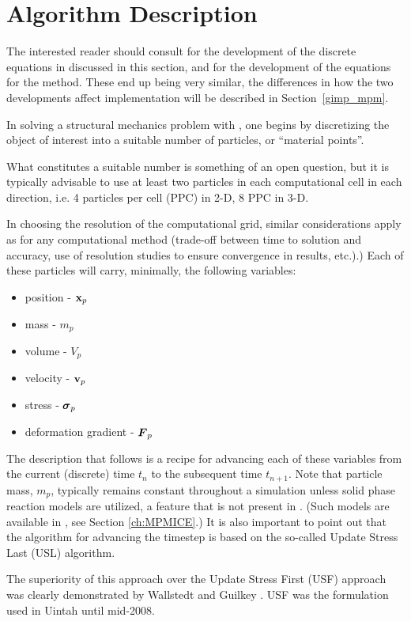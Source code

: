 \section{Algorithm Description} \label{Sec:AlgDesc}
The interested reader should consult \cite{Sulsky1994,Sulsky1995} for the development
of the discrete equations in \MPM discussed in this section, and \cite{Bard2004} for
the development of the equations for the \GIMP method.  These end up being very similar,
the differences in how the two developments affect implementation will be described in
Section~\ref{gimp_mpm}.

In solving a structural mechanics problem with \MPM, one begins by discretizing
the object of interest into a suitable number of particles, or ``material
points''.
\begin{NoteBox}
  What constitutes a suitable number is something of an open
question, but it is typically advisable to use at least two particles in each
computational cell in each direction, i.e. 4 particles per cell (PPC) in 2-D,
8 PPC in 3-D.
\end{NoteBox}

In choosing the resolution of the computational grid, similar
considerations apply as for any computational method (trade-off between
time to solution and accuracy, use of resolution studies to ensure convergence
in results, etc.).)  Each of these particles will carry, minimally, the
following variables:
\begin{itemize}
\item position - $\mathbf{x}_p$
\item mass - $m_p$
\item volume - $V_p$
\item velocity - $\mathbf{v}_p$
\item stress - $\boldsymbol{\sigma}_p$ 
\item deformation gradient - $\boldsymbol{F}_p$
\end{itemize}

The description that follows is a recipe for advancing each of these
variables from the current (discrete) time $t_n$ to the subsequent
time $t_{n+1}$.  Note that particle mass, $m_p$, typically remains constant
throughout a simulation unless solid phase reaction models are utilized,
a feature that is not present in \Vaango \MPM.  (Such models are available
in \MPMICE, see Section \ref{ch:MPMICE}.)  It is also important to point
out that the algorithm for advancing the timestep is based on the so-called
Update Stress Last (USL) algorithm.
\begin{NoteBox}
The superiority of this approach over
the Update Stress First (USF) approach was clearly demonstrated by Wallstedt
and Guilkey \cite{WallstedtJCP}.  USF was the formulation used in Uintah
until mid-2008.
\end{NoteBox}

